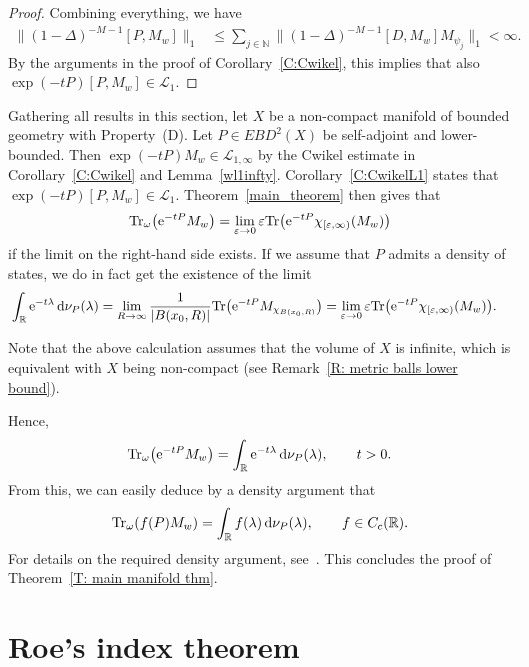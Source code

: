 \documentclass[pdftex]{sigma}
\numberwithin{equation}{section}
\begin{document}
\begin{proof}
Combining everything, we have
\begin{align*}
\big\|(1-\Delta)^{-M-1}[P,M_w]\big\|_1 &\leq \sum_{j \in \mathbb{N}} \big\|(1-\Delta)^{-M-1}[D,M_w] M_{\psi_j}\big\|_1 < \infty.
\end{align*}
By the arguments in the proof of Corollary~\ref{C:Cwikel}, this implies that also $\exp(-tP)[P,M_w] \in \mathcal{L}_1$.
\end{proof}

Gathering all results in this section, let $X$ be a non-compact manifold of bounded geometry with Property~(D). Let $P\in EBD^2(X)$ be self-adjoint and lower-bounded. Then $\exp(-tP)M_w \in \mathcal{L}_{1,\infty}$ by the Cwikel estimate in Corollary~\ref{C:Cwikel} and Lemma~\ref{wl1infty}. Corollary~\ref{C:CwikelL1} states that $\exp(-tP)[P,M_w] \in \mathcal{L}_1$. Theorem~\ref{main_theorem} then gives that
 \[
 \mathrm{Tr}_{\omega}\big({\rm e}^{-tP}M_w\big) = \lim_{\varepsilon\to 0} \varepsilon \mathrm{Tr}\big({\rm e}^{-tP}\chi_{[\varepsilon,\infty)}(M_w)\big)
 \]
if the limit on the right-hand side exists. If we assume that $P$ admits a density of states, we do in fact get the existence of the limit
\begin{align*}
&\int_{\mathbb{R}} {\rm e}^{-t\lambda}\, {\rm d}\nu_P(\lambda)=\lim_{R\to\infty} \frac{1}{|B(x_0,R)|}\mathrm{Tr}\big({\rm e}^{-tP}M_{\chi_{B(x_0,R)}}\big)
 = \lim_{\varepsilon\to 0} \varepsilon \mathrm{Tr}\big({\rm e}^{-tP}\chi_{[\varepsilon,\infty)}(M_w)\big).
\end{align*}

Note that the above calculation assumes that the volume of $X$ is infinite, which is equivalent with $X$ being non-compact (see Remark~\ref{R: metric balls lower bound}).

Hence,
\[
\mathrm{Tr}_{\omega}\big({\rm e}^{-tP}M_w\big) = \int_{\mathbb{R}} {\rm e}^{-t\lambda}\, {\rm d}\nu_P(\lambda),\qquad t>0.
\]
From this, we can easily deduce by a density argument that
\[
\mathrm{Tr}_{\omega}(f(P)M_w) = \int_{\mathbb{R}} f(\lambda)\, {\rm d}\nu_P(\lambda), \qquad f \in C_c(\mathbb{R}).
\]
For details on the required density argument, see~\cite[Remark 6.3]{AMSZ}.
This concludes the proof of Theorem~\ref{T: main manifold thm}.

\section{Roe's index theorem}\label{S:Roe}
\end{document}

